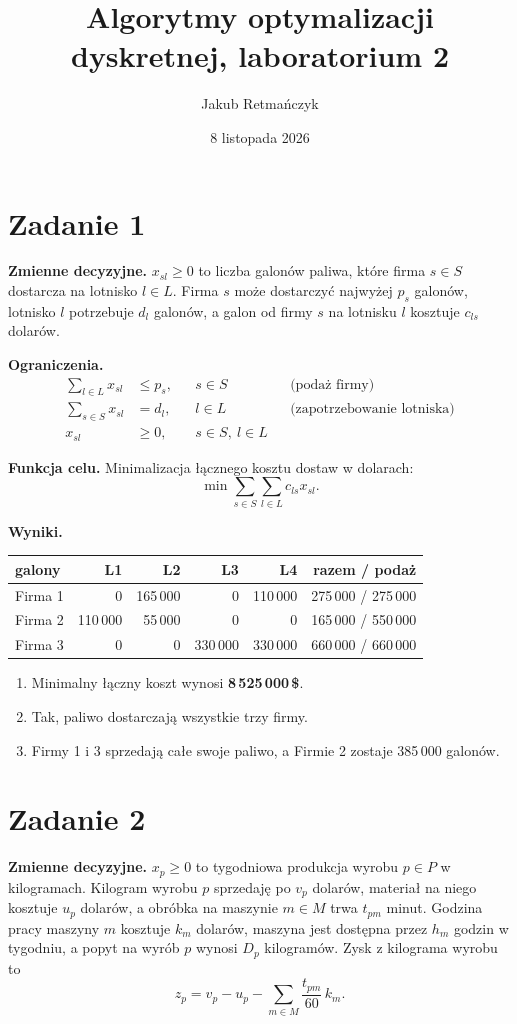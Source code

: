 \documentclass[11pt,a4paper]{article}
\title{Algorytmy optymalizacji dyskretnej, laboratorium 2}
\author{Jakub Retmańczyk}
\date{8 listopada 2026}
\begin{document}
\maketitle

\section*{Zadanie 1}
\textbf{Zmienne decyzyjne.} $x_{sl}\ge 0$ to liczba galonów paliwa, które firma $s\in S$ dostarcza na lotnisko $l\in L$.
Firma $s$ może dostarczyć najwyżej $p_s$ galonów, lotnisko $l$ potrzebuje $d_l$ galonów, a galon od firmy $s$ na lotnisku $l$ kosztuje $c_{ls}$ dolarów.

\textbf{Ograniczenia.}
\begin{align*}
\sum_{l\in L} x_{sl} &\le p_s, && s\in S && \text{(podaż firmy)}\\
\sum_{s\in S} x_{sl} &= d_l, && l\in L && \text{(zapotrzebowanie lotniska)}\\
x_{sl} &\ge 0, && s\in S,\ l\in L
\end{align*}

\textbf{Funkcja celu.} Minimalizacja łącznego kosztu dostaw w dolarach:
\[ \min \sum_{s\in S}\sum_{l\in L} c_{ls}x_{sl}. \]

\textbf{Wyniki.}
\begin{center}
\begin{tabular}{@{}lrrrrr@{}}
\toprule
galony & L1 & L2 & L3 & L4 & razem / podaż \\ \midrule
Firma 1 & 0 & 165\,000 & 0 & 110\,000 & 275\,000 / 275\,000 \\
Firma 2 & 110\,000 & 55\,000 & 0 & 0 & 165\,000 / 550\,000 \\
Firma 3 & 0 & 0 & 330\,000 & 330\,000 & 660\,000 / 660\,000 \\
\bottomrule
\end{tabular}
\end{center}

\begin{enumerate}[label=(\alph*)]
\item Minimalny łączny koszt wynosi \textbf{8\,525\,000\,\$}.
\item Tak, paliwo dostarczają wszystkie trzy firmy.
\item Firmy 1 i 3 sprzedają całe swoje paliwo, a Firmie 2 zostaje 385\,000 galonów.
\end{enumerate}

\section*{Zadanie 2}
\textbf{Zmienne decyzyjne.} $x_p\ge 0$ to tygodniowa produkcja wyrobu $p\in P$ w kilogramach.
Kilogram wyrobu $p$ sprzedaję po $v_p$ dolarów, materiał na niego kosztuje $u_p$ dolarów, a obróbka na maszynie $m\in M$ trwa $t_{pm}$ minut. Godzina pracy maszyny $m$ kosztuje $k_m$ dolarów, maszyna jest dostępna przez $h_m$ godzin w tygodniu, a popyt na wyrób $p$ wynosi $D_p$ kilogramów. Zysk z kilograma wyrobu to
\[ z_p=v_p-u_p-\sum_{m\in M} \frac{t_{pm}}{60}\,k_m. \]
\end{document}
